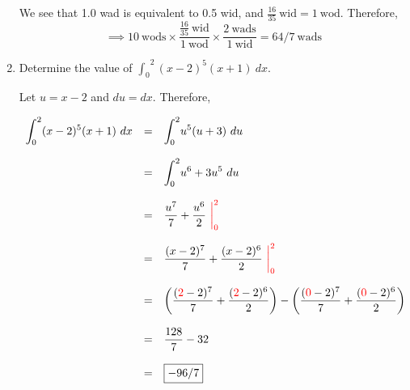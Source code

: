 \documentclass[11pt,paper={letter}]{scrartcl}
\begin{document}
\begin{enumerate}[label=\textbf{\arabic*}.]

\sol We see that 1.0 wad is equivalent to 0.5 wid, and $ \frac{16}{35} \ \text{wid} = 1 \ \text{wod}$. Therefore, $$ \implies 10 \ \text{wods} \times \frac{\frac{16}{35} \ \text{wid}}{1 \ \text{wod}} \times \frac{2 \ \text{wads}}{1 \ \text{wid}} =\boxed{64/7 \ \text{wads}} $$

\item Determine the value of $\displaystyle{{\int_0}^2 (x-2)^5(x+1) \ dx}$.


\sol Let $u = x-2$ and $du = dx$. Therefore,

\begin{equation*}
    \begin{array}{rcl}
        \displaystyle{{\int_0}^2 (x-2)^5(x+1) \ dx} & = & \displaystyle{{\int_0}^2 u^5(u+3) \ du} \\

& &\\ 

          & = & \displaystyle{{\int_0}^2 u^6 + 3u^5 \ du} \\

          && \\

          & = & \dfrac{u^7}{7} + \dfrac{u^6}{2} \ {\color{red} \bigg |_{0}^2} \\

           && \\

          & = & \dfrac{(x-2)^7}{7} + \dfrac{(x-2)^6}{2} \ {\color{red} \bigg |_{0}^2} \\

          && \\

          & = & \left(\dfrac{({\color{red} 2}-2)^7}{7} + \dfrac{({\color{red} 2}-2)^6}{2} \right) - \left(\dfrac{({\color{red} 0}-2)^7}{7} + \dfrac{({\color{red} 0}-2)^6}{2} \right)  \\

          && \\

          & = & \dfrac{128}{7} - 32 \\

          && \\

          & = & \boxed{-96/7} \\
    \end{array}
\end{equation*}


\end{enumerate}
\end{document}
